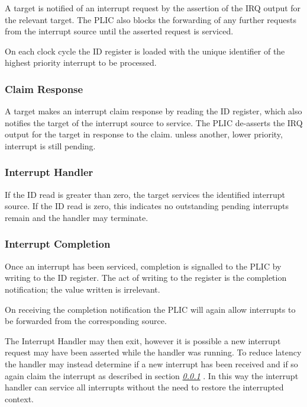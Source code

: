 A target is notified of an interrupt request by the assertion of the IRQ
output for the relevant target. The PLIC also blocks the forwarding of
any further requests from the interrupt source until the asserted
request is serviced.

On each clock cycle the ID register is loaded with the unique identifier
of the highest priority interrupt to be processed.

\subsubsection{Claim Response} \label{sec:claim-response}

A target makes an interrupt claim response by reading the ID register,
which also notifies the target of the interrupt source to service. The
PLIC de-asserts the IRQ output for the target in response to the claim.
unless another, lower priority, interrupt is still pending.

\subsubsection{Interrupt Handler}

If the ID read is greater than zero, the target services the identified
interrupt source. If the ID read is zero, this indicates no outstanding
pending interrupts remain and the handler may terminate.

\subsubsection{Interrupt Completion}

Once an interrupt has been serviced, completion is signalled to the PLIC
by writing to the ID register. The act of writing to the register is the
completion notification; the value written is irrelevant.

On receiving the completion notification the PLIC will again allow
interrupts to be forwarded from the corresponding source.

The Interrupt Handler may then exit, however it is possible a new
interrupt request may have been asserted while the handler was running.
To reduce latency the handler may instead determine if a new interrupt
has been received and if so again claim the interrupt as described in
section \emph{\ref{sec:claim-response} }. In this
way the interrupt handler can service all interrupts without the need to
restore the interrupted context.
